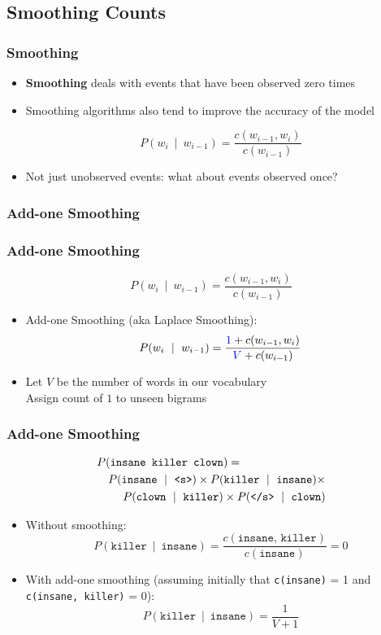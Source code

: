 \subsection{Smoothing Counts}
\begin{frame}
\frametitle{Smoothing}
\begin{itemize}[<+->]

\item {\bf Smoothing} deals with events that have been observed zero times

\item Smoothing algorithms also tend to improve the accuracy of the model

\[ P(w_i~\mid~w_{i-1}) = \frac{ c(w_{i-1},w_i) } { c(w_{i-1}) } \]

\item Not just unobserved events: what about events observed once?
\end{itemize}
\end{frame}

\subsubsection{Add-one Smoothing}

\begin{frame}
\frametitle{Add-one Smoothing}
\[ P(w_i~\mid~w_{i-1}) = \frac{ c(w_{i-1},w_i) } { c(w_{i-1}) } \]
\begin{itemize}[<+->]
\item Add-one Smoothing (aka Laplace Smoothing):
\[ P(w_i~\mid~w_{i-1}) = \frac{ {\color{blue}{1}} + c(w_{i-1},w_i) } { {\color{blue}{V}} + c(w_{i-1}) } \]
\item Let $V$ be the number of words in our vocabulary \\
 Assign count of $1$ to unseen bigrams
\end{itemize}
\end{frame}

\begin{frame}
\frametitle{Add-one Smoothing}
\begin{eqnarray*}
\lefteqn{P(\texttt{insane killer clown})=}\\
&& P(\texttt{insane}~\mid~\texttt{<s>}) \times P(\texttt{killer}~\mid~\texttt{insane}) \times \\
&& P(\texttt{clown}~\mid~\texttt{killer}) \times P(\texttt{</s>}~\mid~\texttt{clown})
\end{eqnarray*}
\begin{itemize}[<+->]
\item Without smoothing:
\[ P(\texttt{killer}~\mid~\texttt{insane}) = \frac{ c(\texttt{insane, killer}) } { c(\texttt{insane}) }  = 0 \]
\item With add-one smoothing (assuming initially that \texttt{c(insane)} = 1 and \texttt{c(insane, killer)} = 0):
\[ P(\texttt{killer}~\mid~\texttt{insane}) = \frac{ 1 } { V + 1 }  \]
\end{itemize}
\end{frame}

